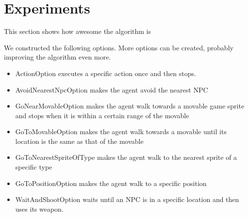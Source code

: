 \section{Experiments}
\label{sec:experiments}
This section shows how awesome the algorithm is

We constructed the following options. More options can be created, probably
improving the algorithm even more.
\begin{itemize}
	\item ActionOption executes a specific action once and then
		stops.
	\item AvoidNearestNpcOption makes the agent avoid the nearest NPC
	\item GoNearMovableOption makes the agent walk towards a
		movable game sprite and stops when it is within a certain range of the
		movable
	\item GoToMovableOption makes the agent walk towards a
		movable until its location is the same as that of the movable
	\item GoToNearestSpriteOfType makes the agent walk to the nearest sprite of
		a specific type
	\item GoToPositionOption makes the agent walk to a specific position
	\item WaitAndShootOption waits until an NPC is in a specific location and
		then uses its weapon.
\end{itemize}

